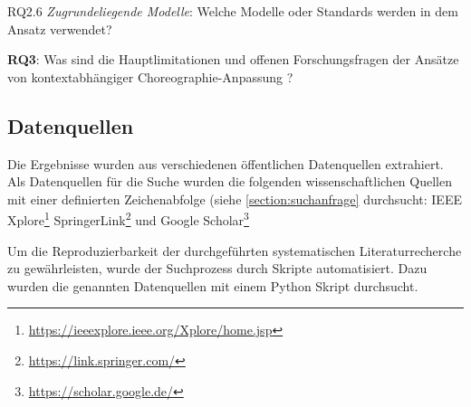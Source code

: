 \documentclass[conference,compsoc,ngerman]{IEEEtran}
\begin{document}
RQ2.6 \textit{Zugrundeliegende Modelle}: Welche Modelle oder Standards werden in dem Ansatz verwendet?

\textbf{RQ3}: Was sind die Hauptlimitationen und offenen Forschungsfragen der Ansätze von \glqq kontextabhängiger Choreographie-Anpassung \grqq?

%
%
%
%


\subsection{Datenquellen}\label{ss:datenquellen}
Die Ergebnisse wurden aus verschiedenen öffentlichen Datenquellen extrahiert. Als Datenquellen für die Suche wurden die folgenden wissenschaftlichen Quellen mit einer definierten Zeichenabfolge (siehe \cref{section:suchanfrage} durchsucht: IEEE Xplore\footnote{\url{https://ieeexplore.ieee.org/Xplore/home.jsp}} SpringerLink\footnote{\url{https://link.springer.com/}} und Google Scholar\footnote{\url{https://scholar.google.de/}}

Um die Reproduzierbarkeit der durchgeführten systematischen Literaturrecherche zu gewährleisten, wurde der Suchprozess durch Skripte automatisiert. Dazu wurden die
genannten Datenquellen mit einem Python Skript durchsucht.
\end{document}
